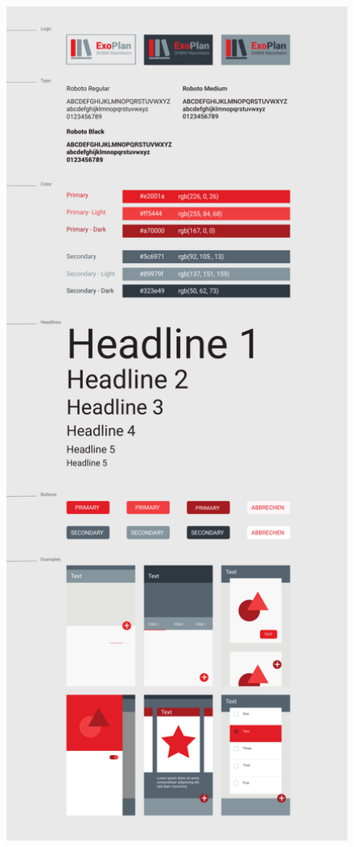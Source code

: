 \begin{figure}[H]
	\centering 
	\includegraphics[page=2, width=12.5cm ]{docs/StyleguideEx.pdf}
\end{figure}

%

